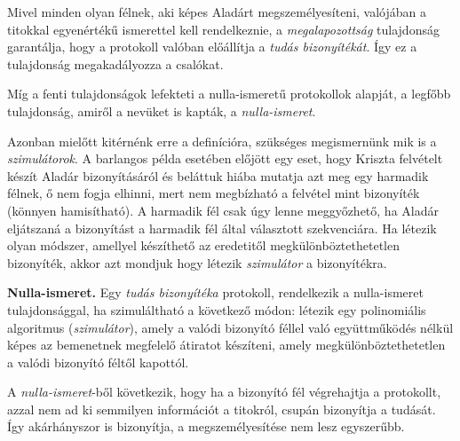 Mivel minden olyan félnek, aki képes Aladárt megszemélyesíteni, valójában a titokkal egyenértékű ismerettel kell rendelkeznie, a \textit{megalapozottság} tulajdonság garantálja, hogy a protokoll valóban előállítja a \textit{tudás bizonyítékát}. Így ez a tulajdonság megakadályozza a csalókat.

Míg a fenti tulajdonságok lefekteti a nulla-ismeretű protokollok alapját, a legfőbb tulajdonság, amiről a nevüket is kapták, a \textit{nulla-ismeret}.

Azonban mielőtt kitérnénk erre a definícióra, szükséges megismernünk mik is a \textit{szimulátorok}. A barlangos példa esetében előjött egy eset, hogy Kriszta felvételt készít Aladár bizonyításáról és beláttuk hiába mutatja azt meg egy harmadik félnek, ő nem fogja elhinni, mert nem megbízható a felvétel mint bizonyíték (könnyen hamisítható). A harmadik fél csak úgy lenne meggyőzhető, ha Aladár eljátszaná a bizonyítást a harmadik fél által választott szekvenciára. Ha létezik olyan módszer, amellyel készíthető az eredetitől megkülönböztethetetlen bizonyíték, akkor azt mondjuk hogy létezik \textit{szimulátor} a bizonyítékra.

\begin{definition}
    \textbf{Nulla-ismeret.} Egy \textit{tudás bizonyítéka} protokoll, rendelkezik a nulla-ismeret tulajdonsággal, ha szimuláltható a következő módon: létezik egy polinomiális algoritmus (\textit{szimulátor}), amely a valódi bizonyító féllel való együttműködés nélkül képes az bemenetnek megfelelő átiratot készíteni, amely megkülönböztethetetlen a valódi bizonyító féltől kapottól.
\end{definition}

A \textit{nulla-ismeret}-ből következik, hogy ha a bizonyító fél végrehajtja a protokollt, azzal nem ad ki semmilyen információt a titokról, csupán bizonyítja a tudását. Így akárhányszor is bizonyítja, a megszemélyesítése nem lesz egyszerűbb.